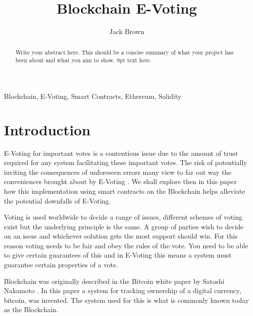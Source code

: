 \documentclass{entcs}
\begin{document}
\begin{frontmatter}

\title{Blockchain E-Voting}
\author{Jack Brown}
\address{School of Computing Science, Newcastle University, UK} 

\begin{abstract} 
Write your abstract here. This should be a concise summary of what your project has been about and what you aim to show. 9pt text here.
\end{abstract}

\begin{keyword}
Blockchain, E-Voting, Smart Contracts, Ethereum, Solidity
\end{keyword}

\end{frontmatter}

\section{Introduction}
E-Voting for important votes is a contentious issue due to the amount of trust required for any system facilitating these important votes. The risk of potentially inviting the consequences of unforeseen errors many view to far out way the conveniences brought about by E-Voting \cite{lauer2004risk}. We shall explore then in this paper how this implementation using smart contracts on the Blockchain helps alleviate the potential downfalls of E-Voting.

Voting is used worldwide to decide a range of issues, different schemes of voting exist but the underlying principle is the same. A group of parties wish to decide on an issue and whichever solution gets the most support should win. For this reason voting needs to be fair and obey the rules of the vote. You need to be able to give certain guarantees of this and in E-Voting this means a system must guarantee certain properties of a vote.

Blockchain was originally described in the Bitcoin white paper by Satoshi Nakamoto \cite{BTCWhitepaper}. In this paper a system for tracking ownership of a digital currency, bitcoin, was invented. The system used for this is what is commonly known today as the Blockchain.
\end{document}
